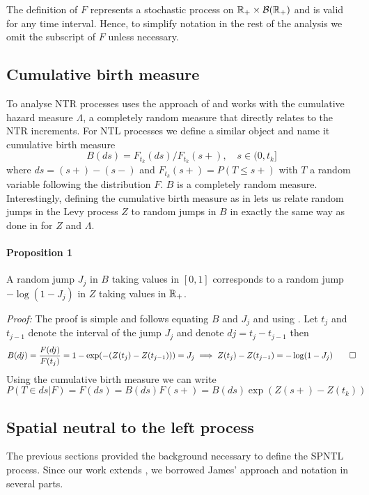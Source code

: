 The definition of $F$ represents a stochastic process on $\mathbb{R}_{+} \times \mathcal{B}(\mathbb{R}_{+})$ and is valid for any time interval. Hence, to simplify notation in the rest of the analysis we omit the subscript of $F$ unless necessary.

\subsection{Cumulative birth measure}\label{CBM}
To analyse NTR processes \cite{james2006poisson} uses the approach of \cite{hjort1990nonparametric} and works with the cumulative hazard measure $\Lambda$, a completely random measure that directly relates to the NTR increments. For NTL processes we define a similar object and name it cumulative birth measure 
\begin{equation}\label{birth_measure}
B(ds) = F_{t_k}(ds)/F_{t_k}(s+), \quad s \in (0, t_k]
\end{equation}
where $ds = (s+) - (s-)$ and $F_{t_k}(s+) = P(T \leq s+)$ with $T$ a random variable following the distribution $F$. $B$ is a completely random measure. Interestingly, defining the cumulative birth measure as in  lets us relate random jumps in the Levy process $Z$ to random jumps in $B$ in exactly the same way as done in \cite{james2006poisson} for $Z$ and $\Lambda$. 

\paragraph{Proposition 1} A random jump $J_j$ in $B$ taking values in $[0,1]$ corresponds to a random jump $-\log(1 - J_j)$ in $Z$ taking values in $\mathbb{R}_+$.

\textit{Proof:} The proof is simple and follows equating $B$ and $J_j$ and using . Let $t_j$ and $t_{j-1}$ denote the interval of the jump $J_j$ and denote $dj = t_j - t_{j-1}$ then
\begin{equation*}
\begin{split}
B(dj) = \frac{F(dj)}{F(t_j)} = 1 - \exp(-(Z(t_j) - Z(t_{j-1}))) = J_j \implies Z(t_j) - Z(t_{j-1}) = -\log(1- J_j) \qed
\end{split}
\end{equation*}
Using the cumulative birth measure we can write
\begin{equation*}
P(T \in ds | F) = F(ds) = B(ds)F(s+) = B(ds)\exp(Z(s+) - Z(t_k))
\end{equation*}

\subsection{Spatial neutral to the left process}\label{SPNTL_process}
The previous sections provided the background necessary to define the SPNTL process. Since our work extends \cite{james2006poisson}, we borrowed James' approach and notation in several parts. 


